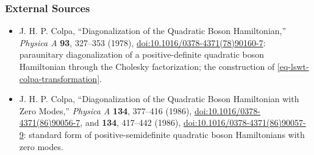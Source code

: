 \subsubsection{External Sources}

\begin{itemize}
\tightlist
\item
  J. H. P. Colpa, ``Diagonalization of the Quadratic Boson Hamiltonian,'' \emph{Physica A} \textbf{93}, 327--353 (1978), \href{https://doi.org/10.1016/0378-4371(78)90160-7}{doi:10.1016/0378-4371(78)90160-7}: paraunitary diagonalization of a positive-definite quadratic boson Hamiltonian through the Cholesky factorization; the construction of \eqref{eq-lswt-colpa-transformation}.
\item
  J. H. P. Colpa, ``Diagonalization of the Quadratic Boson Hamiltonian with Zero Modes,'' \emph{Physica A} \textbf{134}, 377--416 (1986), \href{https://doi.org/10.1016/0378-4371(86)90056-7}{doi:10.1016/0378-4371(86)90056-7}, and \textbf{134}, 417--442 (1986), \href{https://doi.org/10.1016/0378-4371(86)90057-9}{doi:10.1016/0378-4371(86)90057-9}: standard form of positive-semidefinite quadratic boson Hamiltonians with zero modes.
\end{itemize}
